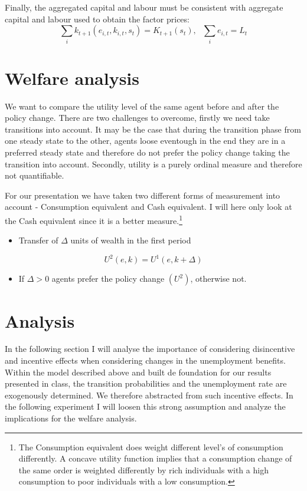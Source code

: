\documentclass[a4paper,12pt]{article}
\begin{document}
Finally, the aggregated capital and labour must be consistent with aggregate capital and labour used to obtain the factor prices: 
\[ \sum_{i}k_{t+1}(e_{i,t},k_{i,t},s_{t})=K_{t+1}(s_{t}), \ \ \ \sum_{i}e_{i,t}=L_{t} 
\]

\section{Welfare analysis}
We want to compare the utility level of the same agent before and after the policy change. There are two challenges to overcome, firstly we need take transitions into account. It may be the case that during the transition phase from one steady state to the other, agents loose eventough in the end they are in a preferred steady state and therefore do not prefer the policy change taking the transition into account. Secondly, utility is a purely ordinal measure and therefore not quantifiable. 

For our presentation we have taken two different forms of measurement into account - Consumption equivalent and Cash equivalent. I will here only look at the Cash equivalent since it is a better measure.\footnote{The Consumption equivalent does weight different level's of consumption differently. A concave utility function implies that a consumption change of the same order is weighted differently by rich individuals with a high consumption to poor individuals with a low consumption.} 

  \begin{itemize}
\item {
  Transfer of $\Delta$ units of wealth in the first period
  }
  \end{itemize}
  
  \begin{equation}
  U^{2}(e,k) = U^{1}(e,k+\Delta) \nonumber
  \end{equation}
  
  \begin{itemize}
  \item {
  If $ \Delta>0 $ agents prefer the policy change $ (U^{2}) $, otherwise not.
  }
  \end{itemize}



\section{Analysis}

In the following section I will analyse the importance of considering disincentive and incentive effects when considering changes in the unemployment benefits. Within the model described above and built de foundation for our results presented in class, the transition probabilities and the unemployment rate are exogenously determined. We therefore abstracted from such incentive effects. In the following experiment I will loosen this strong assumption and analyze the implications for the welfare analysis. 
\end{document}
